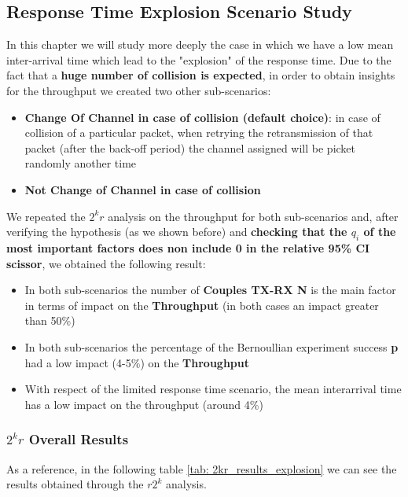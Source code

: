 
\subsection{Response Time Explosion Scenario Study}
In this chapter we will study more deeply the case in which we have a low mean inter-arrival time which lead to the "explosion" of the response time. Due to the fact that a \textbf{huge number of collision is expected}, in order to obtain insights for the throughput we created two other sub-scenarios: 
\begin{itemize}
	\item \textbf{Change Of Channel in case of collision (default choice)}: in case of collision of a particular packet, when retrying the retransmission of that packet (after the back-off period) the channel assigned will be picket randomly another time
	\item \textbf{Not Change of Channel in case of collision}
\end{itemize}
We repeated the $2^{k}r$ analysis on the throughput for both sub-scenarios and, after verifying the hypothesis (as we shown before) and \textbf{checking that the $q_{i}$ of the most important factors does non include 0 in the relative 95\% CI scissor}, we obtained the following result:
\begin{itemize}
	\item In both sub-scenarios the number of \textbf{Couples TX-RX N} is the main factor in terms of impact on the \textbf{Throughput} (in both cases an impact greater than 50\%)
	\item In both sub-scenarios the percentage of the Bernoullian experiment success \textbf{p} had a low impact (4-5\%) on the \textbf{Throughput}
	\item With respect of the limited response time scenario, the mean interarrival time has a low impact on the throughput (around 4\%) 
\end{itemize}
\subsubsection{$2^kr$ Overall Results}
As a reference, in the following table \ref{tab: 2kr_results_explosion} we can see the results obtained through the $r2^k$ analysis.

